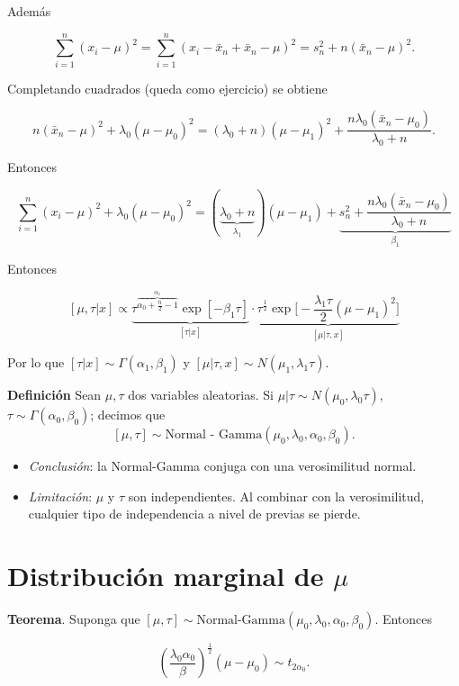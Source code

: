 \documentclass[
  12pt,
]{book}
\begin{document}
Además

\[\sum_{i=1}^n (x_i-\mu)^2 = \sum_{i=1}^n (x_i-\bar x_n + \bar x_n -\mu)^2 = s_n^2 + n(\bar x_n-\mu)^2.\]

Completando cuadrados (queda como ejercicio) se obtiene

\[n(\bar x_n -\mu)^2 + \lambda_0(\mu-\mu_0)^2 = (\lambda_0+n)(\mu-\mu_1)^2 + \dfrac{n\lambda_0(\bar x_n-\mu_0)}{\lambda_0+n}.\]

Entonces

\[\sum_{i=1}^{n}(x_i-\mu)^2 +\lambda_0(\mu-\mu_0)^2 = (\underbrace{\lambda_0+n}_{\lambda_1})(\mu-\mu_1) + \underbrace{s_n^2+\dfrac{n\lambda_0(\bar x_n-\mu_0)}{\lambda_0+n}}_{\beta_1}\]

Entonces

\[[\mu,\tau|x] \propto \underbrace{\tau^{\overbrace{\alpha_0+\frac n2 -1}^{\alpha_1}}\exp[-\beta_1\tau]}_{[\tau|x]} \cdot \underbrace{\tau^{\frac 12} \exp\bigg[-\dfrac{\lambda_1\tau}{2}(\mu-\mu_1)^2\bigg]}_{[\mu|\tau,x]}\]

Por lo que \([\tau|x]\sim \Gamma(\alpha_1,\beta_1)\) y \([\mu|\tau,x] \sim N(\mu_1,\lambda_1\tau)\).

\textbf{Definición} Sean \(\mu,\tau\) dos variables aleatorias. Si \(\mu|\tau \sim N(\mu_0,\lambda_0\tau)\), \(\tau\sim\Gamma(\alpha_0,\beta_0)\); decimos que
\[[\mu, \tau]\sim \text{Normal - Gamma}(\mu_0,\lambda_0,\alpha_0,\beta_0).\]

\begin{itemize}
\item
  \emph{Conclusión}: la Normal-Gamma conjuga con una verosimilitud normal.
\item
  \emph{Limitación}: \(\mu\) y \(\tau\) son independientes. Al combinar con la verosimilitud, cualquier tipo de independencia a nivel de previas se pierde.
\end{itemize}

\hypertarget{distribuciuxf3n-marginal-de-mu}{%
\section{\texorpdfstring{Distribución marginal de \(\mu\)}{Distribución marginal de \textbackslash mu}}\label{distribuciuxf3n-marginal-de-mu}}

\textbf{Teorema}. Suponga que \([\mu,\tau]\sim \text{Normal-Gamma}(\mu_0,\lambda_0,\alpha_0,\beta_0)\). Entonces

\[\left(\dfrac{\lambda_0\alpha_0}{\beta}\right)^{\frac 12}(\mu-\mu_0)\sim t_{2\alpha_0}.\]
\end{document}
